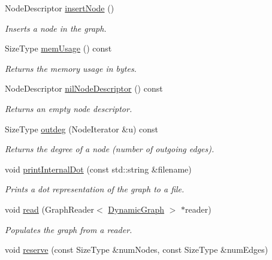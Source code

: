 \begin{DoxyCompactItemize}
NodeDescriptor \hyperlink{class_dynamic_graph_abffc8e608d4e7aaa6f662085adb40dbd}{insertNode} ()
\begin{DoxyCompactList}\small\item\em Inserts a node in the graph. \item\end{DoxyCompactList}\item 
SizeType \hyperlink{class_dynamic_graph_a2f637804e11d0dd69398ef2b1b1c19ee}{memUsage} () const 
\begin{DoxyCompactList}\small\item\em Returns the memory usage in bytes. \item\end{DoxyCompactList}\item 
NodeDescriptor \hyperlink{class_dynamic_graph_a1ecc111c5aa2edcb9f6e545fff8c7b18}{nilNodeDescriptor} () const 
\begin{DoxyCompactList}\small\item\em Returns an empty node descriptor. \item\end{DoxyCompactList}\item 
SizeType \hyperlink{class_dynamic_graph_af3dcd9a6734363cc7bb0b252dad92659}{outdeg} (NodeIterator \&u) const 
\begin{DoxyCompactList}\small\item\em Returns the degree of a node (number of outgoing edges). \item\end{DoxyCompactList}\item 
void \hyperlink{class_dynamic_graph_aa854b347bbc9bacc14c916831f7f8da3}{printInternalDot} (const std::string \&filename)
\begin{DoxyCompactList}\small\item\em Prints a dot representation of the graph to a file. \item\end{DoxyCompactList}\item 
void \hyperlink{class_dynamic_graph_a3c4f4aef60a6c59ca84d266525f8efda}{read} (GraphReader$<$ \hyperlink{class_dynamic_graph}{DynamicGraph} $>$ $\ast$reader)
\begin{DoxyCompactList}\small\item\em Populates the graph from a reader. \item\end{DoxyCompactList}\item 
void \hyperlink{class_dynamic_graph_a8d0cc3347df5c1e93400c789e83f7dd6}{reserve} (const SizeType \&numNodes, const SizeType \&numEdges)

\end{DoxyCompactItemize}

